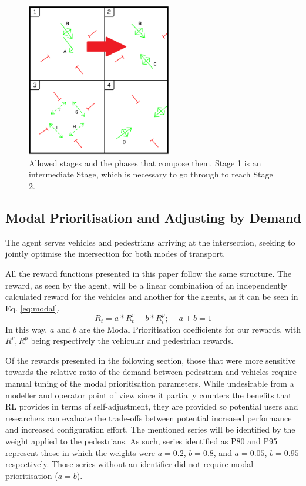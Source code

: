 \documentclass[a4paper, conference]{IEEEtran}
\begin{document}
\begin{figure}                                                
\centering                                                    
\includegraphics[width=2.5in]{phases_limited.png}                                    
\caption{Allowed stages and the phases that compose them. Stage 1 is an intermediate Stage, which is necessary to go through to reach Stage 2.}                                  
\label{intersection_phases}  
                                            
\end{figure}     
\subsection{Modal Prioritisation and Adjusting by Demand}
The agent serves vehicles and pedestrians arriving at the intersection, seeking to jointly optimise the intersection for both modes of transport.

All the reward functions presented in this paper follow the same structure.
The reward, as seen by the agent, will be a linear combination of an independently calculated reward for the vehicles and another for the agents, as it can be seen in Eq. \ref{eq:modal}.
\begin{equation}
R_t = a * R^v_t + b * R^p_t;\,\,\,\,\,\,\ a+b = 1
\label{eq:modal}
\end{equation}
In this way, $a$ and $b$ are the Modal Prioritisation coefficients for our rewards, with $R^v, R^p$ being respectively the vehicular and pedestrian rewards.

Of the rewards presented in the following section, those that were more sensitive towards the relative ratio of the demand between pedestrian and vehicles require manual tuning of the modal prioritisation parameters.
While undesirable from a modeller and operator point of view since it partially counters the benefits that RL provides in terms of self-adjustment, they are provided so potential users and researchers can evaluate the trade-offs between potential increased performance and increased configuration effort.
The mentioned series will be identified by the weight applied to the pedestrians.
As such, series identified as P80 and P95 represent those in which the weights were $a=0.2$, $b=0.8$, and $a=0.05$, $b=0.95$ respectively. 
Those series without an identifier did not require modal prioritisation ($a = b$).
\end{document}

